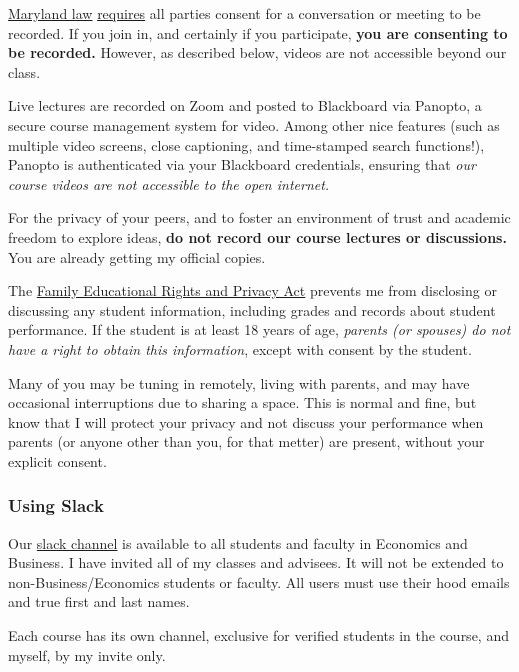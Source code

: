 \documentclass{article}
\begin{document}
\href{https://www.execvision.io/blog/maryland-call-recording-laws/}{Maryland
law}
\href{https://law.justia.com/codes/maryland/2005/gcj/10-402.html}{requires}
all parties consent for a conversation or meeting to be recorded. If you
join in, and certainly if you participate, \textbf{you are consenting to
be recorded.} However, as described below, videos are not accessible
beyond our class.

Live lectures are recorded on Zoom and posted to Blackboard via Panopto,
a secure course management system for video. Among other nice features
(such as multiple video screens, close captioning, and time-stamped
search functions!), Panopto is authenticated via your Blackboard
credentials, ensuring that \emph{our course videos are not accessible to
the open internet.}

For the privacy of your peers, and to foster an environment of trust and
academic freedom to explore ideas, \textbf{do not record our course
lectures or discussions.} You are already getting my official copies.

The
\href{https://www2.ed.gov/policy/gen/guid/fpco/ferpa/index.html}{Family
Educational Rights and Privacy Act} prevents me from disclosing or
discussing any student information, including grades and records about
student performance. If the student is at least 18 years of age,
\emph{parents (or spouses) do not have a right to obtain this
information}, except with consent by the student.

Many of you may be tuning in remotely, living with parents, and may have
occasional interruptions due to sharing a space. This is normal and
fine, but know that I will protect your privacy and not discuss your
performance when parents (or anyone other than you, for that metter) are
present, without your explicit consent.

\hypertarget{using-slack}{%
\subsubsection*{Using Slack}\label{using-slack}}

Our \href{https://hoodcollegeeconomics.slack.com}{slack channel} is
available to all students and faculty in Economics and Business. I have
invited all of my classes and advisees. It will not be extended to
non-Business/Economics students or faculty. All users must use their
hood emails and true first and last names.

Each course has its own channel, exclusive for verified students in the
course, and myself, by my invite only.
\end{document}
